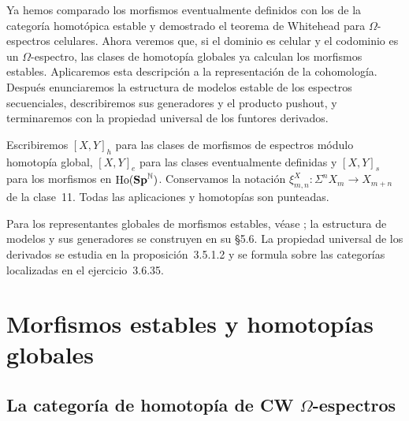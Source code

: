 
Ya hemos comparado los morfismos eventualmente definidos con los de la categoría homotópica estable y demostrado el teorema de Whitehead para $\Omega$-espectros celulares. Ahora veremos que, si el dominio es celular y el codominio es un $\Omega$-espectro, las clases de homotopía globales ya calculan los morfismos estables. Aplicaremos esta descripción a la representación de la cohomología. Después enunciaremos la estructura de modelos estable de los espectros secuenciales, describiremos sus generadores y el producto pushout, y terminaremos con la propiedad universal de los funtores derivados.

Escribiremos $[X,Y]_h$ para las clases de morfismos de espectros módulo homotopía global, $[X,Y]_e$ para las clases eventualmente definidas y $[X,Y]_s$ para los morfismos en $\operatorname{Ho}(\mathbf{Sp}^{\mathbb N})$. Conservamos la notación $\xi^X_{m,n}\colon\Sigma^nX_m\to X_{m+n}$ de la clase~11. Todas las aplicaciones y homotopías son punteadas.

Para los representantes globales de morfismos estables, véase \cite[proposición~3.1.3.10]{malkiewich}; la estructura de modelos y sus generadores se construyen en su \S5.6. La propiedad universal de los derivados se estudia en la proposición~3.5.1.2 y se formula sobre las categorías localizadas en el ejercicio~3.6.35.

\section{Morfismos estables y homotopías globales}

\subsection{La categoría de homotopía de CW \texorpdfstring{$\Omega$}{Omega}-espectros}

